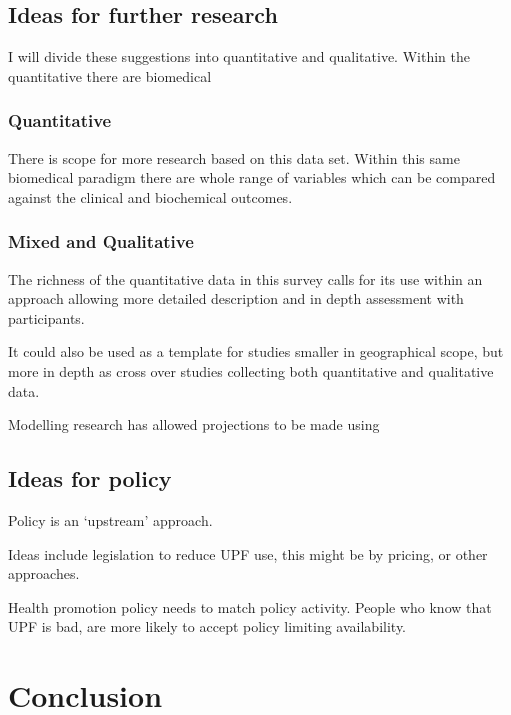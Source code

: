 \documentclass[
]{article}
\begin{document}
\hypertarget{ideas-for-further-research}{%
\subsection{Ideas for further
research}\label{ideas-for-further-research}}

I will divide these suggestions into quantitative and qualitative.
Within the quantitative there are biomedical

\hypertarget{quantitative}{%
\subsubsection{Quantitative}\label{quantitative}}

There is scope for more research based on this data set. Within this
same biomedical paradigm there are whole range of variables which can be
compared against the clinical and biochemical outcomes.

\hypertarget{mixed-and-qualitative}{%
\subsubsection{Mixed and Qualitative}\label{mixed-and-qualitative}}

The richness of the quantitative data in this survey calls for its use
within an approach allowing more detailed description and in depth
assessment with participants.

It could also be used as a template for studies smaller in geographical
scope, but more in depth as cross over studies collecting both
quantitative and qualitative data.

Modelling research has allowed projections to be made using

\hypertarget{ideas-for-policy}{%
\subsection{Ideas for policy}\label{ideas-for-policy}}

Policy is an `upstream' approach.

Ideas include legislation to reduce UPF use, this might be by pricing,
or other approaches.

Health promotion policy needs to match policy activity. People who know
that UPF is bad, are more likely to accept policy limiting availability.

\newpage

\hypertarget{conclusion}{%
\section{Conclusion}\label{conclusion}}
\end{document}
